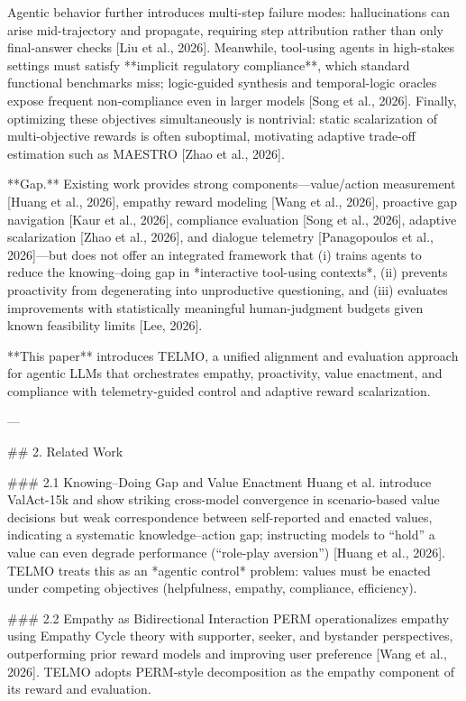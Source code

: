 Agentic behavior further introduces multi-step failure modes: hallucinations can arise mid-trajectory and propagate, requiring step attribution rather than only final-answer checks [Liu et al., 2026]. Meanwhile, tool-using agents in high-stakes settings must satisfy **implicit regulatory compliance**, which standard functional benchmarks miss; logic-guided synthesis and temporal-logic oracles expose frequent non-compliance even in larger models [Song et al., 2026]. Finally, optimizing these objectives simultaneously is nontrivial: static scalarization of multi-objective rewards is often suboptimal, motivating adaptive trade-off estimation such as MAESTRO [Zhao et al., 2026].  

**Gap.** Existing work provides strong components—value/action measurement [Huang et al., 2026], empathy reward modeling [Wang et al., 2026], proactive gap navigation [Kaur et al., 2026], compliance evaluation [Song et al., 2026], adaptive scalarization [Zhao et al., 2026], and dialogue telemetry [Panagopoulos et al., 2026]—but does not offer an integrated framework that (i) trains agents to reduce the knowing–doing gap in *interactive tool-using contexts*, (ii) prevents proactivity from degenerating into unproductive questioning, and (iii) evaluates improvements with statistically meaningful human-judgment budgets given known feasibility limits [Lee, 2026].  

**This paper** introduces TELMO, a unified alignment and evaluation approach for agentic LLMs that orchestrates empathy, proactivity, value enactment, and compliance with telemetry-guided control and adaptive reward scalarization.

---

## 2. Related Work  

### 2.1 Knowing–Doing Gap and Value Enactment  
Huang et al. introduce ValAct-15k and show striking cross-model convergence in scenario-based value decisions but weak correspondence between self-reported and enacted values, indicating a systematic knowledge–action gap; instructing models to “hold” a value can even degrade performance (“role-play aversion”) [Huang et al., 2026]. TELMO treats this as an *agentic control* problem: values must be enacted under competing objectives (helpfulness, empathy, compliance, efficiency).

### 2.2 Empathy as Bidirectional Interaction  
PERM operationalizes empathy using Empathy Cycle theory with supporter, seeker, and bystander perspectives, outperforming prior reward models and improving user preference [Wang et al., 2026]. TELMO adopts PERM-style decomposition as the empathy component of its reward and evaluation.

